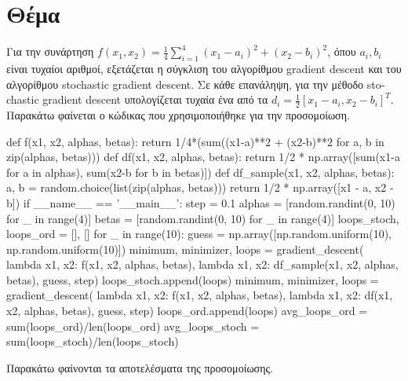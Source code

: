 \documentclass{article}
\newcommand{\eng}[1]{\foreignlanguage{english}{#1}} %
\begin{document}
\clearpage
\section{Θέμα}

Για την συνάρτηση $f(x_1, x_2) = \frac{1}{4} \sum_{i=1}^{4} (x_1 - a_i)^2 + (x_2 - b_i)^2$,
όπου $a_i, b_i$ είναι τυχαίοι αριθμοί, εξετάζεται η σύγκλιση του αλγορίθμου
\eng{gradient descent} και του αλγορίθμου \eng{stochastic gradient descent}.
Σε κάθε επανάληψη, για την μέθοδο \eng{stochastic gradient descent} υπολογίζεται
τυχαία ένα από τα $d_i = \frac{1}{2} [x_1 - a_i, x_2 - b_i]^T$. Παρακάτω φαίνεται
ο κώδικας που χρησιμοποιήθηκε για την προσομοίωση.

\begin{python}
def f(x1, x2, alphas, betas):
    return 1/4*(sum((x1-a)**2 + (x2-b)**2 for a, b in zip(alphas, betas)))
def df(x1, x2, alphas, betas):
    return 1/2 * np.array([sum(x1-a for a in alphas), sum(x2-b for b in betas)])
def df_sample(x1, x2, alphas, betas):
    a, b = random.choice(list(zip(alphas, betas)))
    return 1/2 * np.array([x1 - a, x2 - b])
if __name__ == '__main__':
    step = 0.1
    alphas = [random.randint(0, 10) for _ in range(4)]
    betas = [random.randint(0, 10) for _ in range(4)]
    loops_stoch, loops_ord = [], []
    for _ in range(10):
        guess = np.array([np.random.uniform(10), np.random.uniform(10)])
        minimum, minimizer, loops = gradient_descent(
                lambda x1, x2: f(x1, x2, alphas, betas),
                lambda x1, x2: df_sample(x1, x2, alphas, betas),
                guess, step)
        loops_stoch.append(loops)
        minimum, minimizer, loops = gradient_descent(
                lambda x1, x2: f(x1, x2, alphas, betas),
                lambda x1, x2: df(x1, x2, alphas, betas),
                guess, step)
        loops_ord.append(loops)
    avg_loops_ord = sum(loops_ord)/len(loops_ord)
    avg_loops_stoch = sum(loops_stoch)/len(loops_stoch)
\end{python}

Παρακάτω φαίνονται τα αποτελέσματα της προσομοίωσης.
\end{document}
